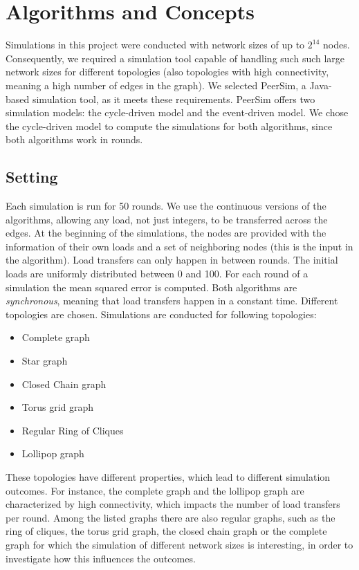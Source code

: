 \chapter{Algorithms and Concepts}\label{chap:background}


Simulations in this project were conducted with network sizes of up to $2^{14}$ nodes. Consequently, we required a simulation tool capable of handling such such large network sizes for different topologies (also topologies with high connectivity, meaning a high number of edges in the graph). We selected PeerSim, a Java-based simulation tool, as it meets these requirements. PeerSim offers two simulation models: the cycle-driven model and the event-driven model. We chose the cycle-driven model to compute the simulations for both algorithms, since both algorithms work in rounds.

\section{Setting}
Each simulation is run for 50 rounds. We use the continuous versions of the algorithms, allowing any load, not just integers, to be transferred across the edges. At the beginning of the simulations, the nodes are provided with the information of their own loads and a set of neighboring nodes (this is the input in the algorithm). Load transfers can only happen in between rounds. The initial loads are uniformly distributed between 0 and 100. For each round of a simulation the mean squared error is computed. Both algorithms are \textit{synchronous}, meaning that load transfers happen in a constant time. Different topologies are chosen. Simulations are conducted for following topologies:
\begin{itemize}
    \item Complete graph
    \item Star graph
    \item Closed Chain graph
    \item Torus grid graph
    \item Regular Ring of Cliques
    \item Lollipop graph
\end{itemize}
These topologies have different properties, which lead to different simulation outcomes. For instance, the complete graph and the lollipop graph are characterized by high connectivity, which impacts the number of load transfers per round. Among the listed graphs there are also regular graphs, such as the ring of cliques, the torus grid graph, the closed chain graph or the complete graph for which the simulation of different network sizes is interesting, in order to investigate how this influences the outcomes.


